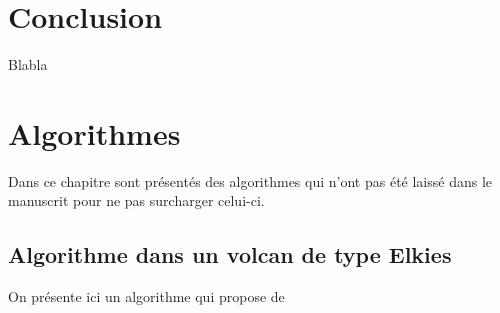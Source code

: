 \documentclass[10pt,a4paper]{book}
\theoremstyle{plain}
\theoremstyle{definition}
\theoremstyle{definition}
\theoremstyle{definition}
\theoremstyle{definition}
\theoremstyle{remark}
\theoremstyle{remark}
\theoremstyle{definition}
\begin{document}
 

\chapter{Conclusion}
Blabla 




\appendix
\chapter{Algorithmes}
\label{cha:alg}
Dans ce chapitre sont présentés des algorithmes qui n'ont pas été laissé dans le manuscrit pour ne pas surcharger celui-ci.
\section{Algorithme dans un volcan de type Elkies}
On présente ici un algorithme qui propose de 
\end{document}
